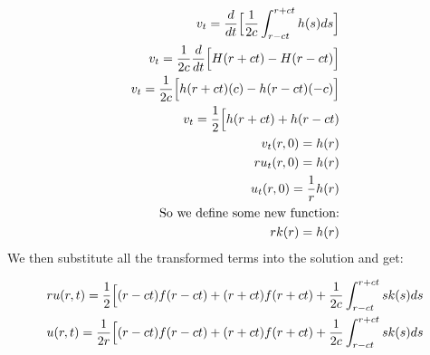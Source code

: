 \documentclass{article}
\begin{document}
\begin{equation}
\begin{aligned}
v_t = \frac{d}{dt} \Big{[}\frac{1}{2c}\int^{r+ct}_{r-ct}h(s)ds \Big{]}\\
v_t =\frac{1}{2c} \frac{d}{dt} \Big{[}H(r+ct) - H(r-ct) \Big{]}\\
v_t = \frac{1}{2c} \Big{[}h(r+ct)(c) - h(r-ct)(-c)\Big{]}\\
v_t = \frac{1}{2} \Big{[}h(r+ct) + h(r-ct)\\
v_t(r,0) = h(r)\\
ru_t(r,0) = h(r)\\
u_t(r,0) = \frac{1}{r}h(r)\\
\text{So we define some new function:}\\
rk(r) = h(r)
\end{aligned}
\end{equation}
We then substitute all the transformed terms into the solution and get:
\begin{tcolorbox}[minipage,colback=white,arc=0pt,outer arc=0pt]
\begin{equation}
\begin{aligned}
ru(r,t) = \frac{1}{2} \Big{[}(r-ct)f(r-ct) + (r+ct)f(r+ct) + \frac{1}{2c}\int_{r-ct}^{r+ct}sk(s)ds\\
u(r,t) = \frac{1}{2r} \Big{[}(r-ct)f(r-ct) + (r+ct)f(r+ct) + \frac{1}{2c}\int_{r-ct}^{r+ct}sk(s)ds\\
\end{aligned}
\end{equation}
\end{tcolorbox}
\end{document}
